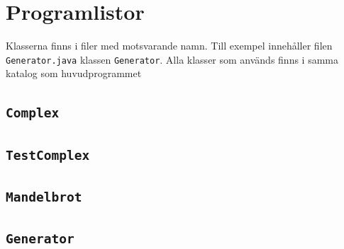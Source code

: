 \documentclass[a4paper]{article}
\newcommand{\code}[1]{\texttt{#1}} %
\begin{document}
\section{Programlistor}
Klasserna finns i filer med motsvarande namn. Till exempel innehåller filen  \code{Generator.java} klassen \code{Generator}. Alla klasser som används finns i samma katalog som huvudprogrammet

\subsection{\code{Complex}}

\subsection{\code{TestComplex}}

\subsection{\code{Mandelbrot}}

\subsection{\code{Generator}}
\end{document}

